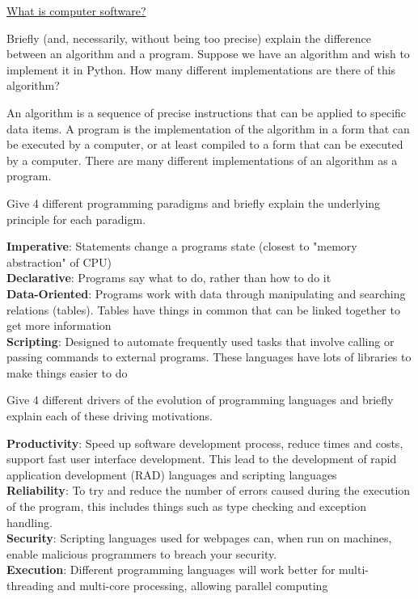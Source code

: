 \documentclass{exam}
\begin{document}
\begin{center}
	\underline{\huge What is computer software?}
\end{center}
\begin{questions}
\question[5]Briefly (and, necessarily, without being too precise) explain the difference
between an algorithm and a program. Suppose we have an
algorithm and wish to implement it in Python. How many different
implementations are there of this algorithm? 
\begin{solution}[2in]
An algorithm is a sequence of precise instructions that can be applied to specific data items. A program is the implementation of the algorithm in a form that can be executed by a computer, or at least compiled to a form that can be executed by a computer. There are many different implementations of an algorithm as a program.
\end{solution}
\question[6]Give 4 different programming paradigms and briefly explain the underlying
principle for each paradigm.
\begin{solution}[2in]
\textbf{Imperative}: Statements change a programs state (closest to "memory abstraction" of CPU)\\
\textbf{Declarative}: Programs say what to do, rather than how to do it\\
\textbf{Data-Oriented}: Programs work with data through manipulating and searching relations (tables). Tables have things in common that can be linked together to get more information\\
\textbf{Scripting}: Designed to automate frequently used tasks that involve calling or passing commands to external programs. These languages have lots of libraries to make things easier to do
\end{solution}

\question[4]Give 4 different drivers of the evolution of programming languages and
briefly explain each of these driving motivations.
\begin{solution}[2in]
\textbf{Productivity}: Speed up software development process, reduce times and costs, support fast user interface development. This lead to the development of rapid application development (RAD) languages and scripting languages\\
\textbf{Reliability}: To try and reduce the number of errors caused during the execution of the program, this includes things such as type checking and exception handling.\\
\textbf{Security}: Scripting languages used for webpages can, when run on machines, enable malicious programmers to breach your security.\\
\textbf{Execution}: Different programming languages will work better for multi-threading and multi-core processing, allowing parallel computing\\
\end{solution}


\end{questions}
\end{document}
